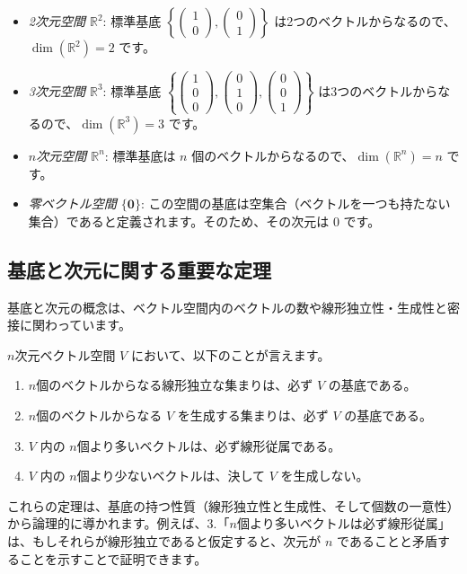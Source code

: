 \begin{ex}
\begin{itemize}
\item \emph{2次元空間 $\mathbb{R}^2$}: 標準基底 $\left\{\begin{pmatrix} 1 \\ 0 \end{pmatrix}, \begin{pmatrix} 0 \\ 1 \end{pmatrix}\right\}$ は2つのベクトルからなるので、$\dim(\mathbb{R}^2) = 2$ です。
\item \emph{3次元空間 $\mathbb{R}^3$}: 標準基底 $\left\{\begin{pmatrix} 1 \\ 0 \\ 0 \end{pmatrix}, \begin{pmatrix} 0 \\ 1 \\ 0 \end{pmatrix}, \begin{pmatrix} 0 \\ 0 \\ 1 \end{pmatrix}\right\}$ は3つのベクトルからなるので、$\dim(\mathbb{R}^3) = 3$ です。
\item \emph{$n$次元空間 $\mathbb{R}^n$}: 標準基底は $n$ 個のベクトルからなるので、$\dim(\mathbb{R}^n) = n$ です。
\item \emph{零ベクトル空間 $\{\bm{0}\}$}: この空間の基底は空集合（ベクトルを一つも持たない集合）であると定義されます。そのため、その次元は $0$ です。
\end{itemize}
\end{ex}

\subsection{基底と次元に関する重要な定理}
基底と次元の概念は、ベクトル空間内のベクトルの数や線形独立性・生成性と密接に関わっています。
\begin{thm}
$n$次元ベクトル空間 $V$ において、以下のことが言えます。
\begin{enumerate}
\item $n$個のベクトルからなる線形独立な集まりは、必ず $V$ の基底である。
\item $n$個のベクトルからなる $V$ を生成する集まりは、必ず $V$ の基底である。
\item $V$ 内の $n$個より多いベクトルは、必ず線形従属である。
\item $V$ 内の $n$個より少ないベクトルは、決して $V$ を生成しない。
\end{enumerate}
\begin{proof*}[アイデア(定理 5.2 の3.と4.)]
これらの定理は、基底の持つ性質（線形独立性と生成性、そして個数の一意性）から論理的に導かれます。例えば、3.「$n$個より多いベクトルは必ず線形従属」は、もしそれらが線形独立であると仮定すると、次元が $n$ であることと矛盾することを示すことで証明できます。
\end{proof*}
\end{thm}

